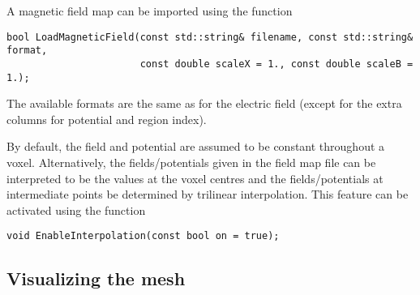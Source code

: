 A magnetic field map can be imported using the function
\begin{lstlisting}
bool LoadMagneticField(const std::string& filename, const std::string& format,
                       const double scaleX = 1., const double scaleB = 1.);
\end{lstlisting}
The available formats are the same as for the electric field (except for the 
extra columns for potential and region index).

By default, the field and potential are assumed to be constant throughout 
a voxel. Alternatively, the fields/potentials given in the field map file
can be interpreted to be the values at the voxel centres and the 
fields/potentials at intermediate points be determined by trilinear interpolation.
This feature can be activated using the function
\begin{lstlisting}
void EnableInterpolation(const bool on = true);
\end{lstlisting} 
 
\subsection{Visualizing the mesh}

